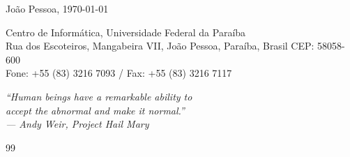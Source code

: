 \documentclass{tcc}
\begin{document}
\vfill
\begin{center}
João Pessoa, \today
\end{center}

\vspace{0.05in}

\begin{center}
\footnotesize{ Centro de Informática, Universidade Federal da Paraíba\\
Rua dos Escoteiros, Mangabeira VII, João Pessoa, Paraíba, Brasil CEP: 58058-600\\
Fone: +55 (83) 3216 7093 / Fax: +55 (83) 3216 7117}
\end{center}
\newpage

\vfill

\vspace*{\fill}

\begin{flushright}
    \begin{minipage}{8cm} 
        \em ``Human beings have a remarkable ability to\\accept the abnormal and make it normal.''\\--- Andy Weir, Project Hail Mary
    \end{minipage}
\end{flushright}


\newpage

%




\newpage


\newpage


\newpage

\renewcommand{\listfigurename}{\centering LISTA DE FIGURAS}
\listoffigures
\newpage

\renewcommand{\listtablename}{\centering LISTA DE TABELAS}
\listoftables
\newpage

\listofquadros
\newpage



\newpage


\renewcommand{\contentsname}{\centering SUMÁRIO}
\tableofcontents

\newpage
\pagestyle{plain} %






\renewcommand{\refname}{\centering REFERÊNCIAS} %
\begingroup
  \singlespacing 
  \raggedright
  \begin{thebibliography}{99}
  
  \end{thebibliography}
\endgroup
\end{document}
